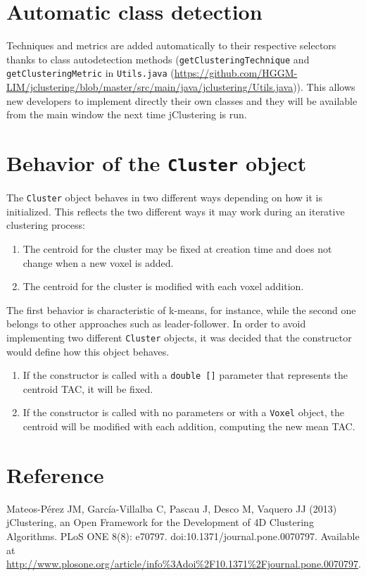 \documentclass[11pt]{article} %
\begin{document}
\section{Automatic class detection}
\label{sec:automatic_class}

Techniques and metrics are added automatically to their respective selectors thanks to class autodetection methods ({\tt getClusteringTechnique} and {\tt getClusteringMetric} in {\tt Utils.java} (\url{https://github.com/HGGM-LIM/jclustering/blob/master/src/main/java/jclustering/Utils.java})). This allows new developers to implement directly their own classes and they will be available from the main window the next time jClustering is run.

\section{Behavior of the {\tt Cluster} object}
\label{sec:cluster_behavior}

The {\tt Cluster} object behaves in two different ways depending on how it is initialized. This reflects the two different ways it may work during an iterative clustering process:

\begin{enumerate}
\item The centroid for the cluster may be fixed at creation time and does not change when a new voxel is added.
\item The centroid for the cluster is modified with each voxel addition.
\end{enumerate}

The first behavior is characteristic of k-means, for instance, while the second one belongs to other approaches such as leader-follower. In order to avoid implementing two different {\tt Cluster} objects, it was decided that the constructor would define how this object behaves.

\begin{enumerate}
\item If the constructor is called with a {\tt double []} parameter that represents the centroid TAC, it will be fixed.
\item If the constructor is called with no parameters or with a {\tt Voxel} object, the centroid will be modified with each addition, computing the new mean TAC.
\end{enumerate}

\section{Reference}
\label{sec:reference}

Mateos-Pérez JM, García-Villalba C, Pascau J, Desco M, Vaquero JJ (2013) jClustering, an Open Framework for the Development of 4D Clustering Algorithms. PLoS ONE 8(8): e70797. doi:10.1371/journal.pone.0070797. Available at
\url{http://www.plosone.org/article/info\%3Adoi\%2F10.1371\%2Fjournal.pone.0070797}.
\end{document}
